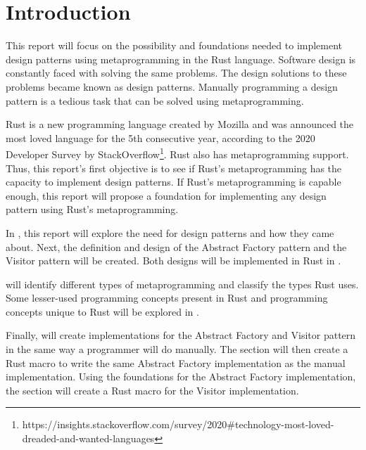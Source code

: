 \section{Introduction}
This report will focus on the possibility and foundations needed to implement design patterns using metaprogramming in the Rust language.
Software design is constantly faced with solving the same problems.
The design solutions to these problems became known as design patterns.
Manually programming a design pattern is a tedious task that can be solved using metaprogramming.

Rust is a new programming language created by Mozilla and was announced the most loved language for the 5th consecutive year, according to the 2020 Developer Survey by StackOverflow\footnote{https://insights.stackoverflow.com/survey/2020\#technology-most-loved-dreaded-and-wanted-languages}.
Rust also has metaprogramming support.
Thus, this report's first objective is to see if Rust's metaprogramming has the capacity to implement design patterns.
If Rust's metaprogramming is capable enough, this report will propose a foundation for implementing any design pattern using Rust's metaprogramming.

In , this report will explore the need for design patterns and how they came about.
Next, the definition and design of the Abstract Factory pattern and the Visitor pattern will be created.
Both designs will be implemented in Rust in .

 will identify different types of metaprogramming and classify the types Rust uses.
Some lesser-used programming concepts present in Rust and programming concepts unique to Rust will be explored in .

Finally,  will create implementations for the Abstract Factory and Visitor pattern in the same way a programmer will do manually.
The section will then create a Rust macro to write the same Abstract Factory implementation as the manual implementation.
Using the foundations for the Abstract Factory implementation, the section will create a Rust macro for the Visitor implementation.